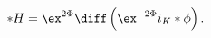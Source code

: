 \begin{equation}
\label{2spinG2H}
   * H = \ex^{2\Phi}\diff \left(\ex^{-2\Phi} i_K * \phi\right) .
\end{equation}

